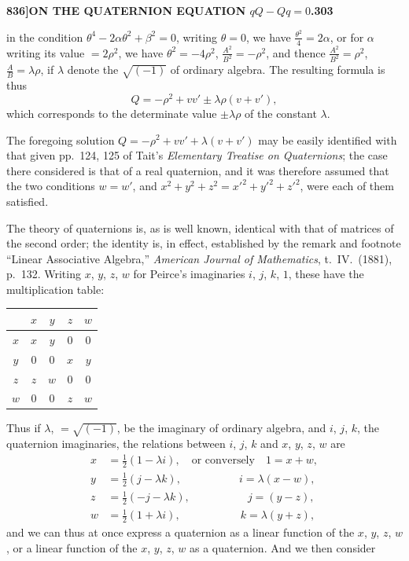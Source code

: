 \documentclass[12pt,a4paper]{article}
\theoremstyle{definition}
\begin{document}
\noindent\textbf{836]}\hfill\textbf{ON THE QUATERNION EQUATION $qQ - Qq = 0$.}\hfill\textbf{303}

\bigskip

\noindent in the condition $\theta^4 - 2\alpha\theta^2 + \beta^2 = 0$, writing $\theta = 0$, we have $\frac{\theta^2}{4} = 2\alpha$, or for $\alpha$ writing its value $= 2\rho^2$, we have $\theta^2 = -4\rho^2$, $\frac{A^2}{B^2} = -\rho^2$, and thence $\frac{A^2}{B^2} = \rho^2$, $\frac{A}{B} = \lambda\rho$, if $\lambda$ denote the $\sqrt{(-1)}$ of ordinary algebra. The resulting formula is thus
\[
Q = -\rho^2 + vv' \pm \lambda\rho(v + v'),
\]
which corresponds to the determinate value $\pm\lambda\rho$ of the constant $\lambda$.

The foregoing solution $Q = -\rho^2 + vv' + \lambda(v + v')$ may be easily identified with that given pp.\ 124, 125 of Tait's \textit{Elementary Treatise on Quaternions}; the case there considered is that of a real quaternion, and it was therefore assumed that the two conditions $w = w'$, and $x^2 + y^2 + z^2 = x'^2 + y'^2 + z'^2$, were each of them satisfied.

The theory of quaternions is, as is well known, identical with that of matrices of the second order; the identity is, in effect, established by the remark and footnote ``Linear Associative Algebra,'' \textit{American Journal of Mathematics}, t.\ IV.\ (1881), p.\ 132. Writing $x$, $y$, $z$, $w$ for Peirce's imaginaries $i$, $j$, $k$, $1$, these have the multiplication table:

\medskip
\begin{center}
\begin{tabular}{c|cccc}
 & $x$ & $y$ & $z$ & $w$ \\
\hline
$x$ & $x$ & $y$ & $0$ & $0$ \\
$y$ & $0$ & $0$ & $x$ & $y$ \\
$z$ & $z$ & $w$ & $0$ & $0$ \\
$w$ & $0$ & $0$ & $z$ & $w$
\end{tabular}
\end{center}
\medskip

Thus if $\lambda$, $=\sqrt{(-1)}$, be the imaginary of ordinary algebra, and $i$, $j$, $k$, the quaternion imaginaries, the relations between $i$, $j$, $k$ and $x$, $y$, $z$, $w$ are
\begin{align*}
x &= \tfrac{1}{2}(1 - \lambda i), \quad \text{or conversely} \quad 1 = x + w, \\
y &= \tfrac{1}{2}(j - \lambda k), \qquad\qquad\quad\ i = \lambda(x - w), \\
z &= \tfrac{1}{2}(-j - \lambda k), \qquad\qquad\quad\ j = (y - z), \\
w &= \tfrac{1}{2}(1 + \lambda i), \qquad\qquad\quad\ \ k = \lambda(y + z),
\end{align*}
and we can thus at once express a quaternion as a linear function of the $x$, $y$, $z$, $w$, or a linear function of the $x$, $y$, $z$, $w$ as a quaternion. And we then consider
\end{document}
